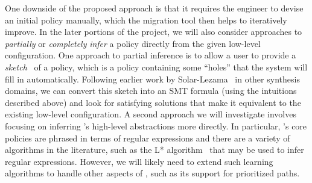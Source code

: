 
One downside of the proposed approach is that it requires the engineer
to devise an initial \Name policy manually, which the migration tool
then helps to iteratively improve.  In the later portions of the project, 
we will also consider approaches to \emph{partially} or 
\emph{completely} {\em infer} a \Name policy directly from the given
low-level configuration.  One approach to partial inference is
to allow a user to provide a \emph{sketch}~\cite{sketch} of a policy,
which is a policy containing some ``holes'' that the system will fill in
automatically.  Following earlier work by Solar-Lezama~\cite{sketch}
in other synthesis domains, we can convert this sketch into an SMT formula
(using the intuitions described above)
and look for satisfying solutions that make it equivalent to 
the existing low-level configuration.
A second approach we will investigate involves focusing on inferring \Name's
high-level abstractions more directly.  In particular, \Name's core policies are
phrased in terms of regular expressions and there are a variety of algorithms
in the literature, such as the L* algorithm~\cite{Angluin87} that may be used to
infer regular expressions.
However, we will likely need to extend such
learning algorithms to handle other aspects of \Name, such as its
support for prioritized paths.

